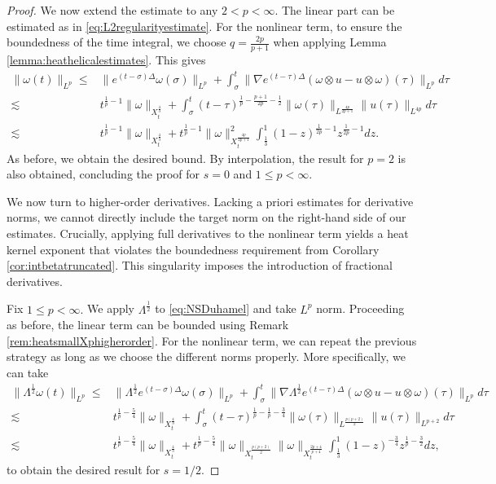 \documentclass[10pt,a4paper]{amsart}
\def\heat#1{e^{#1 \Delta}}
\newcommand{\na}{\nabla}
\newcommand{\w}{\omega}
\begin{document}
\begin{proof}
We now extend the estimate to any $2<p<\infty$.
The linear part can be estimated as in \eqref{eq:L2regularityestimate}. For the nonlinear term, to ensure the boundedness of the time integral, we choose $q=\frac{2p}{p+1}$ when applying Lemma \ref{lemma:heathelicalestimates}. This gives
$$
\begin{aligned}
\|\w(t)\|_{L^p}\leq& \|\heat{(t-\sigma)}\w(\sigma)\|_{L^p}+\int_\sigma^t\|\na\heat{(t-\tau)}(\w\otimes u-u\otimes \w)(\tau)\|_{L^p}d\tau\\
\lesssim & t^{\frac{1}{p}-1}\|\omega\|_{X_t^{\frac{4}{3}}}+\int_\sigma^t (t-\tau)^{\frac{1}{p}-\frac{p+1}{2p}-\frac{1}{2}}\|\w(\tau)\|_{L^\frac{4p}{2p+1}}\|u(\tau)\|_{L^{4p}}d\tau\\
\lesssim & t^{\frac{1}{p}-1}\|\omega\|_{X_t^{\frac{4}{3}}}+ t^{\frac{1}{p}-1}\|\w\|^2_{X_t^\frac{4p}{2p+1}}\int_{\frac{1}{3}}^1 (1-z)^{\frac1{2p}-1}z^{\frac{1}{2p}-1}dz.
\end{aligned}$$
As before, we obtain the desired bound.
By interpolation, the result for $p=2$ is also obtained, concluding the proof for $s=0$ and $1\leq p<\infty.$

We now turn to higher-order derivatives. Lacking a priori estimates for derivative norms, we cannot directly include the target norm on the right-hand side of our estimates. Crucially, applying full derivatives to the nonlinear term yields a heat kernel exponent that violates the boundedness requirement from Corollary \ref{cor:intbetatruncated}. This singularity imposes the introduction of fractional derivatives.

Fix $1\leq p<\infty.$ We apply $\Lambda^\frac{1}{2}$ to \eqref{eq:NSDuhamel} and take $L^p$ norm. Proceeding as before, the linear term can be bounded using Remark \ref{rem:heatsmallXphigherorder}. For the nonlinear term, we can repeat the previous strategy as long as we choose the different norms properly. More specifically, we can take
$$
\begin{aligned}
\|\Lambda^\frac{1}{2}\w(t)\|_{L^p}\leq& \|\Lambda^\frac{1}{2}\heat{(t-\sigma)}\w(\sigma)\|_{L^p}+\int_\sigma^t\|\na\Lambda^{\frac{1}{2}}\heat{(t-\tau)}(\w\otimes u-u\otimes \w)(\tau)\|_{L^p}d\tau\\
\lesssim & t^{\frac{1}{p}-\frac{5}{4}}\|\omega\|_{X_t^{\frac{4}{3}}}+\int_\sigma^t (t-\tau)^{\frac{1}{p}-\frac{1}{p}-\frac{3}{4}}\|\w(\tau)\|_{L^{\frac{p(p+2)}{2}}}\|u(\tau)\|_{L^{p+2}}d\tau\\
\lesssim & t^{\frac{1}{p}-\frac{5}{4}}\|\omega\|_{X_t^{\frac{4}{3}}}+ t^{\frac{1}{p}-\frac{5}{4}}\|\omega\|_{X_t^{\frac{p(p+2)}{2}}}\|\omega\|_{X_t^{\frac{2p+4}{p+4}}}\int_{\frac{1}{3}}^1 (1-z)^{-\frac{3}{4}}z^{\frac{1}{p}-\frac{3}{2}}dz,
\end{aligned}$$
to obtain the desired result for $s=1/2$.


\end{proof}
\end{document}
